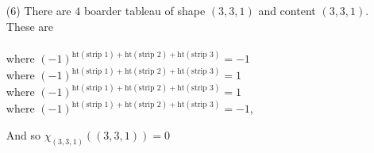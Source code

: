 \documentclass[12pt]{amsart}
\begin{document}
\begin{itemize}
 \item[(6)] There are $4$ boarder tableau of shape $(3,3,1)$ and content $(3,3,1)$. These are\\\\
  \;\;\; where $(-1)^{\text{ht}(\text{strip }1)+\text{ht}(\text{strip }2)+\text{ht}(\text{strip }3)}=-1$\\
  \;\;\; where $(-1)^{\text{ht}(\text{strip }1)+\text{ht}(\text{strip }2)+\text{ht}(\text{strip }3)}=1$\\
  \;\;\; where $(-1)^{\text{ht}(\text{strip }1)+\text{ht}(\text{strip }2)+\text{ht}(\text{strip }3)}=1$\\
 \;\;\; where $(-1)^{\text{ht}(\text{strip }1)+\text{ht}(\text{strip }2)+\text{ht}(\text{strip }3)}=-1$,  

And so $\chi_{(3,3,1)}((3,3,1))=0$


\end{itemize}
\end{document}
